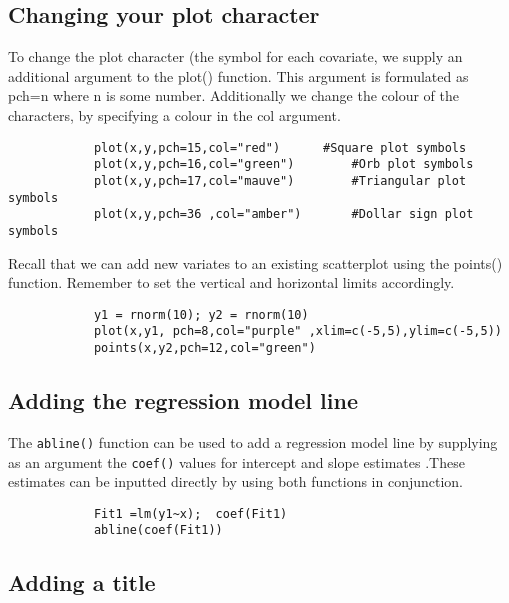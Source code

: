 			\subsection{Changing your plot character}
			
			To change the plot character (the symbol for each covariate, we supply an additional argument to the plot() function.  This argument is formulated as pch=n where n is some number.
			Additionally we change the colour of the characters, by specifying a colour in the col argument.
			\footnotesize \begin{verbatim}
			plot(x,y,pch=15,col="red")		#Square plot symbols
			plot(x,y,pch=16,col="green")		#Orb plot symbols
			plot(x,y,pch=17,col="mauve")		#Triangular plot symbols
			plot(x,y,pch=36	,col="amber")		#Dollar sign plot symbols
			\end{verbatim}\normalsize
			Recall that we can add new variates to an existing scatterplot using the points() function. Remember to set the vertical and horizontal limits accordingly.
			\footnotesize \begin{verbatim}
			y1 = rnorm(10); y2 = rnorm(10)
			plot(x,y1, pch=8,col="purple" ,xlim=c(-5,5),ylim=c(-5,5))
			points(x,y2,pch=12,col="green")
			\end{verbatim}\normalsize
			\subsection{Adding the regression model line}
			
			The \texttt{abline()} function can be used to add a regression model line  by supplying as an argument the \texttt{coef()} values for intercept and slope estimates .These estimates can be inputted directly by using both functions in conjunction.
			
			\footnotesize \begin{verbatim}
			Fit1 =lm(y1~x);  coef(Fit1)
			abline(coef(Fit1))	
			\end{verbatim}\normalsize
			
			\subsection{Adding a title }
			
